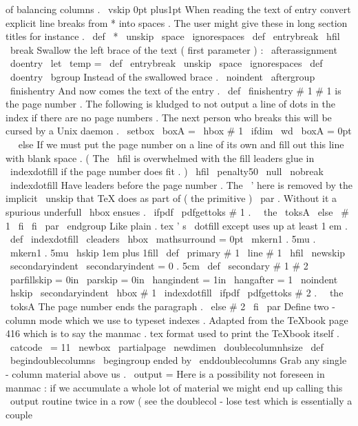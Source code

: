 {{{{{of
balancing
%
columns
.
\
vskip
0pt
plus1pt
%
%
When
reading
the
text
of
entry
convert
explicit
line
breaks
%
from
*
into
spaces
.
The
user
might
give
these
in
long
section
%
titles
for
instance
.
\
def
\
*
{
\
unskip
\
space
\
ignorespaces
}
%
\
def
\
entrybreak
{
\
hfil
\
break
}
%
%
%
Swallow
the
left
brace
of
the
text
(
first
parameter
)
:
\
afterassignment
\
doentry
\
let
\
temp
=
}
\
def
\
entrybreak
{
\
unskip
\
space
\
ignorespaces
}
%
\
def
\
doentry
{
%
\
bgroup
%
Instead
of
the
swallowed
brace
.
\
noindent
\
aftergroup
\
finishentry
%
And
now
comes
the
text
of
the
entry
.
}
\
def
\
finishentry
#
1
{
%
%
#
1
is
the
page
number
.
%
%
The
following
is
kludged
to
not
output
a
line
of
dots
in
the
index
if
%
there
are
no
page
numbers
.
The
next
person
who
breaks
this
will
be
%
cursed
by
a
Unix
daemon
.
\
setbox
\
boxA
=
\
hbox
{
#
1
}
%
\
ifdim
\
wd
\
boxA
=
0pt
\
%
\
else
%
%
If
we
must
put
the
page
number
on
a
line
of
its
own
and
fill
out
%
this
line
with
blank
space
.
(
The
\
hfil
is
overwhelmed
with
the
%
fill
leaders
glue
in
\
indexdotfill
if
the
page
number
does
fit
.
)
\
hfil
\
penalty50
\
null
\
nobreak
\
indexdotfill
%
Have
leaders
before
the
page
number
.
%
%
The
\
'
here
is
removed
by
the
implicit
\
unskip
that
TeX
does
as
%
part
of
(
the
primitive
)
\
par
.
Without
it
a
spurious
underfull
%
\
hbox
ensues
.
\
ifpdf
\
pdfgettoks
#
1
.
%
\
\
the
\
toksA
\
else
\
#
1
%
\
fi
\
fi
\
par
\
endgroup
}
%
Like
plain
.
tex
'
s
\
dotfill
except
uses
up
at
least
1
em
.
\
def
\
indexdotfill
{
\
cleaders
\
hbox
{
\
mathsurround
=
0pt
\
mkern1
.
5mu
.
\
mkern1
.
5mu
}
\
hskip
1em
plus
1fill
}
\
def
\
primary
#
1
{
\
line
{
#
1
\
hfil
}
}
\
newskip
\
secondaryindent
\
secondaryindent
=
0
.
5cm
\
def
\
secondary
#
1
#
2
{
{
%
\
parfillskip
=
0in
\
parskip
=
0in
\
hangindent
=
1in
\
hangafter
=
1
\
noindent
\
hskip
\
secondaryindent
\
hbox
{
#
1
}
\
indexdotfill
\
ifpdf
\
pdfgettoks
#
2
.
\
\
the
\
toksA
%
The
page
number
ends
the
paragraph
.
\
else
#
2
\
fi
\
par
}
}
%
Define
two
-
column
mode
which
we
use
to
typeset
indexes
.
%
Adapted
from
the
TeXbook
page
416
which
is
to
say
%
the
manmac
.
tex
format
used
to
print
the
TeXbook
itself
.
\
catcode
\
=
11
\
newbox
\
partialpage
\
newdimen
\
doublecolumnhsize
\
def
\
begindoublecolumns
{
\
begingroup
%
ended
by
\
enddoublecolumns
%
Grab
any
single
-
column
material
above
us
.
\
output
=
{
%
%
%
Here
is
a
possibility
not
foreseen
in
manmac
:
if
we
accumulate
a
%
whole
lot
of
material
we
might
end
up
calling
this
\
output
%
routine
twice
in
a
row
(
see
the
doublecol
-
lose
test
which
is
%
essentially
a
couple
}}}}}}
